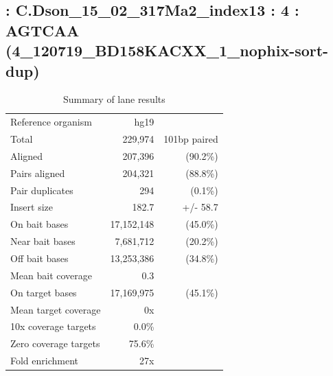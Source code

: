 \documentclass{article}
\begin{document}
    
\subsection*{ : C.Dson\_15\_02\_317Ma2\_index13 : 4 : AGTCAA (4\_120719\_BD158KACXX\_1\_nophix-sort-dup)}

    \begin{table}[h]
    \centering
    \begin{tabular}{|l|rr|}
    \hline
            Reference organism & hg19 &  \\ 
            Total & 229,974 & 101bp paired \\ 
            Aligned & 207,396 & (90.2\%) \\ 
            Pairs aligned & 204,321 & (88.8\%) \\ 
            Pair duplicates & 294 & (0.1\%) \\ 
            Insert size & 182.7 & +/- 58.7 \\ 
            \hline
            On bait bases & 17,152,148 & (45.0\%) \\ 
            Near bait bases & 7,681,712 & (20.2\%) \\ 
            Off bait bases & 13,253,386 & (34.8\%) \\ 
            Mean bait coverage & 0.3 &  \\ 
            On target bases & 17,169,975 & (45.1\%) \\ 
            Mean target coverage & 0x &  \\ 
            10x coverage targets & 0.0\% &  \\ 
            Zero coverage targets & 75.6\% &  \\ 
            Fold enrichment & 27x &  \\ 
    \hline
    \end{tabular}
    \caption{Summary of lane results}
    \end{table}
\end{document}
